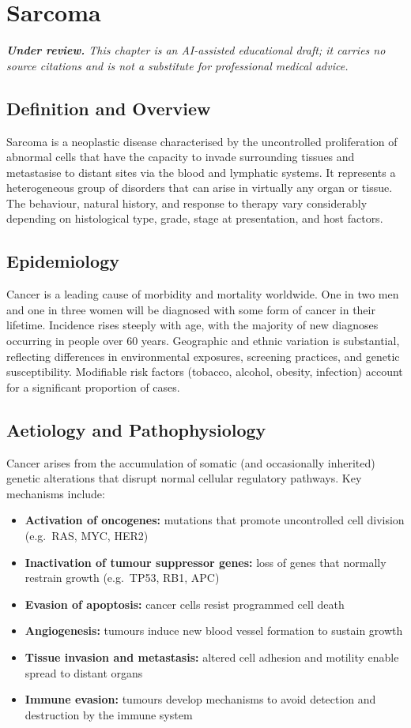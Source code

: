 \chapter{Sarcoma}

\medskip
\noindent\textit{\textbf{Under review.} This chapter is an AI-assisted educational draft; it carries no source citations and is not a substitute for professional medical advice.}

\section*{Definition and Overview}
Sarcoma is a neoplastic disease characterised by the uncontrolled proliferation of abnormal cells that have the capacity to invade surrounding tissues and metastasise to distant sites via the blood and lymphatic systems. It represents a heterogeneous group of disorders that can arise in virtually any organ or tissue. The behaviour, natural history, and response to therapy vary considerably depending on histological type, grade, stage at presentation, and host factors.

\section*{Epidemiology}
Cancer is a leading cause of morbidity and mortality worldwide. One in two men and one in three women will be diagnosed with some form of cancer in their lifetime. Incidence rises steeply with age, with the majority of new diagnoses occurring in people over 60 years. Geographic and ethnic variation is substantial, reflecting differences in environmental exposures, screening practices, and genetic susceptibility. Modifiable risk factors (tobacco, alcohol, obesity, infection) account for a significant proportion of cases.

\section*{Aetiology and Pathophysiology}
Cancer arises from the accumulation of somatic (and occasionally inherited) genetic alterations that disrupt normal cellular regulatory pathways. Key mechanisms include:

\begin{itemize}
    \item \textbf{Activation of oncogenes:} mutations that promote uncontrolled cell division (e.g.\ RAS, MYC, HER2)
    \item \textbf{Inactivation of tumour suppressor genes:} loss of genes that normally restrain growth (e.g.\ TP53, RB1, APC)
    \item \textbf{Evasion of apoptosis:} cancer cells resist programmed cell death
    \item \textbf{Angiogenesis:} tumours induce new blood vessel formation to sustain growth
    \item \textbf{Tissue invasion and metastasis:} altered cell adhesion and motility enable spread to distant organs
    \item \textbf{Immune evasion:} tumours develop mechanisms to avoid detection and destruction by the immune system
\end{itemize}

